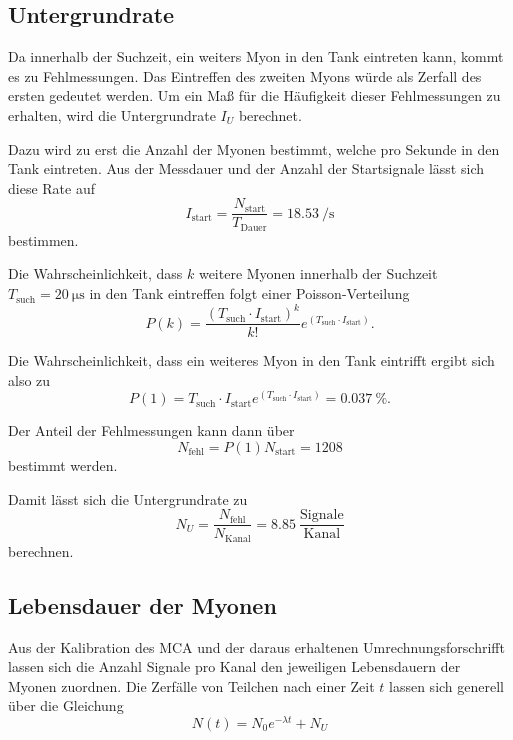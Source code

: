 \subsection{Untergrundrate}

Da innerhalb der Suchzeit, ein weiters Myon in den Tank eintreten kann, kommt es zu Fehlmessungen. Das Eintreffen des zweiten Myons würde als Zerfall des ersten gedeutet werden.  Um ein Maß für die Häufigkeit dieser Fehlmessungen zu erhalten, wird die Untergrundrate $I_U$ berechnet.


Dazu wird zu erst die Anzahl der Myonen bestimmt, welche pro Sekunde in den Tank eintreten. 
Aus der Messdauer und der Anzahl der Startsignale lässt sich diese Rate auf
\begin{equation}
    I_\text{start} = \frac{N_\text{start}}{T_\text{Dauer}} = \SI{18.53}{\per\s}
\end{equation}
bestimmen.

Die Wahrscheinlichkeit, dass $k$ weitere Myonen innerhalb der Suchzeit $T_\text{such} = \SI{20}{\micro\s}$ in den Tank eintreffen folgt einer Poisson-Verteilung 
\begin{equation}
    P(k) = \frac{(T_\text{such} \cdot I_\text{start})^k}{k!} e^{(T_\text{such} \cdot I_\text{start})} .
\end{equation}

Die Wahrscheinlichkeit, dass ein weiteres Myon in den Tank eintrifft ergibt sich also zu 
\begin{equation}
    P(1) = T_\text{such}\cdot I_\text{start} e^{(T_\text{such} \cdot I_\text{start})} = \SI{0.037}{\percent} .
\end{equation}

Der Anteil der Fehlmessungen kann dann über 
\begin{equation}
    N_\text{fehl} = P(1)N_\text{start} = \num{1208}
\end{equation}
bestimmt werden.

Damit lässt sich die Untergrundrate zu 
\begin{equation}
    N_U = \frac{N_\text{fehl}}{N_\text{Kanal}} = \num{8.85} \: \frac{\text{Signale}}{\text{Kanal}}
\end{equation}
berechnen.

\subsection{Lebensdauer der Myonen}

Aus der Kalibration des MCA und der daraus erhaltenen Umrechnungsforschrifft lassen sich die Anzahl Signale pro Kanal den jeweiligen Lebensdauern der Myonen zuordnen. Die Zerfälle von Teilchen nach einer Zeit $t$ lassen sich generell über die Gleichung
\begin{equation}
    N(t) = N_0 e^{-\lambda t} + N_U
\end{equation}

